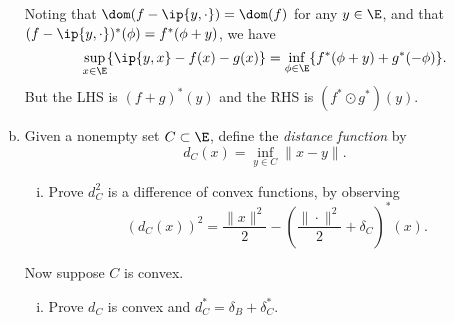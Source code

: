 \documentclass[../borwein-lewis_notes.tex]{subfiles}
\begin{document}
\begin{enumerate}[(a)]
{\begin{equation*}
\end{equation*}
Noting that $\dom(f-\ip{y,\cdot})=\dom(f)$ for any $y\in\E$, and 
that $(f-\ip{y,\cdot})^*(\phi) = f^*(\phi+y)$, we have 
\begin{equation*}
\sup_{x\in\E}\{\ip{y,x} - f(x) - g(x)\} = \inf_{\phi\in\E}\{f^*(\phi+y)
+ g^*(-\phi)\}.
\end{equation*}
But the LHS is $(f+g)^*(y)$ and the RHS is $(f^*\odot g^*)(y)$.
}
\item Given a nonempty set $C\subset\E$, define the \textit{distance 
function} by 
\begin{equation*}
d_C(x) = \inf_{y\in C}\|x-y\|.
\end{equation*}
\begin{enumerate}[(i)]
\item Prove $d_C^2$ is a difference of convex functions, by observing 
\begin{equation*}
(d_C(x))^2 = \frac{\|x\|^2}{2} - \left(\frac{\|\cdot\|^2}{2} + 
\delta_C\right)^*(x).
\end{equation*} 
\end{enumerate}
Now suppose $C$ is convex. 
\begin{enumerate}[(i),resume]
\item Prove $d_C$ is convex and $d_C^* = \delta_B+\delta_C^*$.\\
\end{enumerate}
\end{enumerate}
\end{document}
